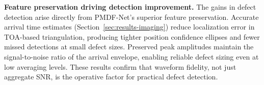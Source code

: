 \textbf{Feature preservation driving detection improvement.} The gains in defect detection arise directly from PMDF-Net's superior feature preservation. Accurate arrival time estimates (Section~\ref{sec:results-imaging}) reduce localization error in TOA-based triangulation, producing tighter position confidence ellipses and fewer missed detections at small defect sizes. Preserved peak amplitudes maintain the signal-to-noise ratio of the arrival envelope, enabling reliable defect sizing even at low averaging levels. These results confirm that waveform fidelity, not just aggregate SNR, is the operative factor for practical defect detection.
